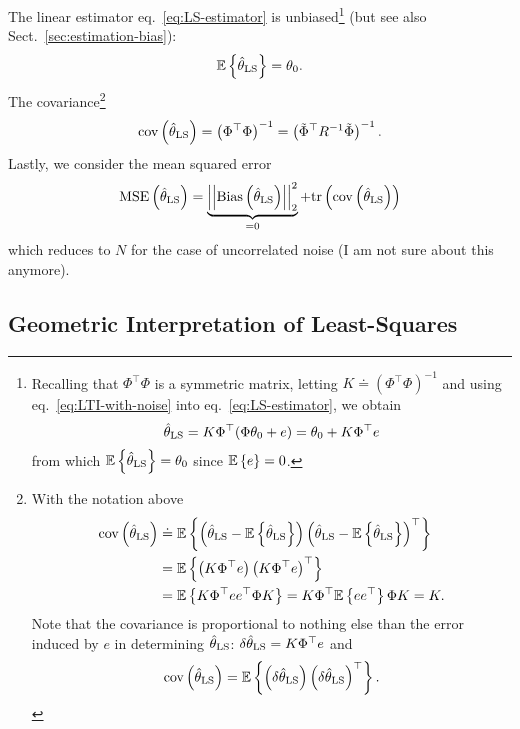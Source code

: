 The linear estimator eq.~\eqref{eq:LS-estimator} is unbiased\footnote{Recalling that $\Phi^\top \Phi$ is a symmetric matrix, letting $K\doteq (\Phi^\top \Phi)^{-1}$ and using eq.~\eqref{eq:LTI-with-noise} into eq.~\eqref{eq:LS-estimator}, we obtain
  \begin{equation}
    \label{eq:thetaLS-estimate}
    \hat{\theta}_\textrm{LS} = K\Phi^\top (\Phi\theta_0 + e) = \theta_0 + K\Phi^\top e
  \end{equation}
  from which $\mathbb{E}\left\{\hat{\theta}_\textrm{LS}\right\} = \theta_0$ since $\mathbb{E}\left\{e\right\}=0$.} (but see also Sect.~\ref{sec:estimation-bias}):
\begin{equation*}
  \mathbb{E}\left\{\hat{\theta}_\textrm{LS}\right\} = \theta_0.
\end{equation*}
The covariance\footnote{With the notation above
  \begin{align*}
    \textrm{cov}\left(\hat{\theta}_\textrm{LS}\right) &\doteq \mathbb{E}\left\{\left(\hat{\theta}_\textrm{LS} - \mathbb{E}\left\{\hat{\theta}_\textrm{LS}\right\}\right) \left(\hat{\theta}_\textrm{LS} - \mathbb{E}\left\{\hat{\theta}_\textrm{LS}\right\}\right)^\top\right\} \\
                   &= \mathbb{E}\left\{\left(K \Phi^\top e\right) \left(K \Phi^\top e\right)^\top\right\} \\
                   &= \mathbb{E}\left\{K \Phi^\top e e^\top \Phi K\right\} = K \Phi^\top \mathbb{E}\left\{ee^\top\right\} \Phi K = K.
  \end{align*}
  Note that the covariance is proportional to nothing else than the error induced by $e$ in determining $\hat{\theta}_\textrm{LS}$: $\delta \hat{\theta}_\textrm{LS} = K\Phi^\top e$ and
  \begin{equation*}
    \textrm{cov}\left(\hat{\theta}_\textrm{LS}\right) = \mathbb{E}\left\{\left(\delta \hat{\theta}_\textrm{LS}\right) \left(\delta \hat{\theta}_\textrm{LS}\right)^\top\right\}.
  \end{equation*}}
\begin{equation}
  \label{eq:covariance-LS}
  \textrm{cov}\left(\hat{\theta}_\textrm{LS}\right) = \left(\Phi^\top \Phi\right)^{-1} = \left(\tilde{\Phi}^\top R^{-1} \tilde{\Phi}\right)^{-1}.
\end{equation}
Lastly, we consider the mean squared error
\begin{equation*}
  \textrm{MSE}\left(\hat{\theta}_\textrm{LS}\right) = \underbrace{\left|\left|\textrm{Bias}\left(\hat{\theta}_\textrm{LS}\right)\right|\right|_2^2}_{=0} + \textrm{tr}\left(\textrm{cov}\left(\hat{\theta}_\textrm{LS}\right)\right)
\end{equation*}
which reduces to $N$ for the case of uncorrelated noise (I am not sure about this anymore).

\subsection{Geometric Interpretation of Least-Squares}

